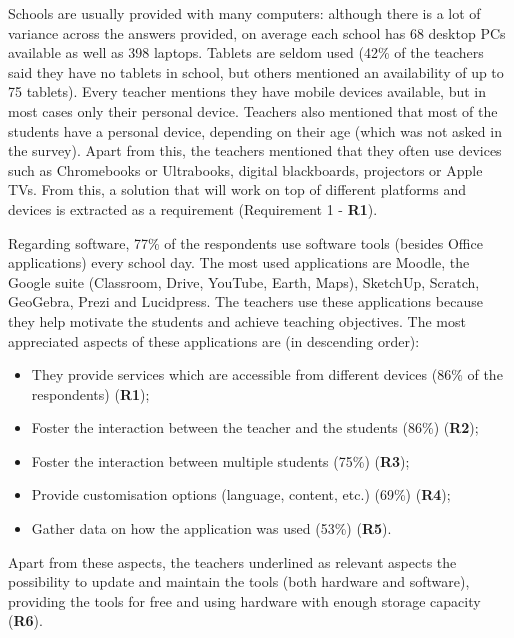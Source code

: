Schools are usually provided with many computers: although there is a lot of variance across the answers provided, on average each school has 68 desktop PCs available as well as 398 laptops. Tablets are seldom used (42\% of the teachers said they have no tablets in school, but others mentioned an availability of up to 75 tablets). Every teacher mentions they have mobile devices available, but in most cases only their personal device. Teachers also mentioned that most of the students have a personal device, depending on their age (which was not asked in the survey). Apart from this, the teachers mentioned that they often use devices such as Chromebooks or Ultrabooks, digital blackboards, projectors or Apple TVs. From this, a solution that will work on top of different platforms and devices is extracted as a requirement (Requirement 1 - \textbf{R1}).

Regarding software, 77\% of the respondents use software tools (besides Office applications) every school day. The most used applications are Moodle, the Google suite (Classroom, Drive, YouTube, Earth, Maps), SketchUp, Scratch, GeoGebra, Prezi and Lucidpress. The teachers use these applications because they help motivate the students and achieve teaching objectives. The most appreciated aspects of these applications are (in descending order):
\begin{itemize}
        \item They provide services which are accessible from different devices (86\% of the respondents) (\textbf{R1});
        \item Foster the interaction between the teacher and the students (86\%) (\textbf{R2});
        \item Foster the interaction between multiple students (75\%) (\textbf{R3});
        \item Provide customisation options (language, content, etc.) (69\%) (\textbf{R4});
        \item Gather data on how the application was used (53\%) (\textbf{R5}).
\end{itemize}

Apart from these aspects, the teachers underlined as relevant aspects the possibility to update and maintain the tools (both hardware and software), providing the tools for free and using hardware with enough storage capacity (\textbf{R6}).

